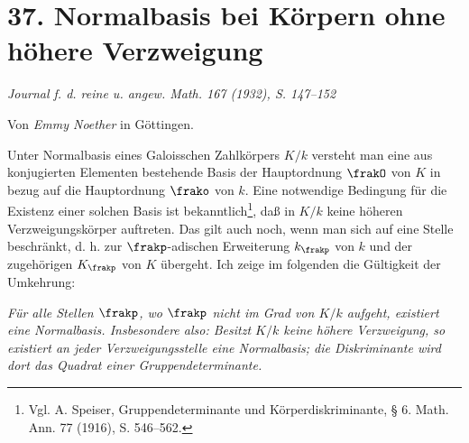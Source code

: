 \section*{37. Normalbasis bei Körpern ohne höhere Verzweigung}

\begin{center}
\emph{Journal f. d. reine u. angew. Math. 167 (1932), S. 147--152}
\end{center}

\begin{center}
Von \emph{Emmy Noether} in Göttingen.
\end{center}

Unter Normalbasis eines Galoisschen Zahlkörpers \(K/k\) versteht man eine aus konjugierten Elementen bestehende Basis der Hauptordnung \(\frakO\) von \(K\) in bezug auf die Hauptordnung \(\frako\) von \(k\). Eine notwendige Bedingung für die Existenz einer solchen Basis ist bekanntlich\footnote{Vgl. A. Speiser, Gruppendeterminante und Körperdiskriminante, § 6. Math. Ann. 77 (1916), S. 546--562.}, daß in \(K/k\) keine höheren Verzweigungskörper auftreten. Das gilt auch noch, wenn man sich auf eine Stelle beschränkt, d. h. zur \(\frakp\)-adischen Erweiterung \(k_\frakp\) von \(k\) und der zugehörigen \(K_\frakp\) von \(K\) übergeht. Ich zeige im folgenden die Gültigkeit der Umkehrung:

\emph{Für alle Stellen \(\frakp\), wo \(\frakp\) nicht im Grad von \(K/k\) aufgeht, existiert eine Normalbasis. Insbesondere also: Besitzt \(K/k\) keine höhere Verzweigung, so existiert an jeder Verzweigungsstelle eine Normalbasis; die Diskriminante wird dort das Quadrat einer Gruppendeterminante.}

